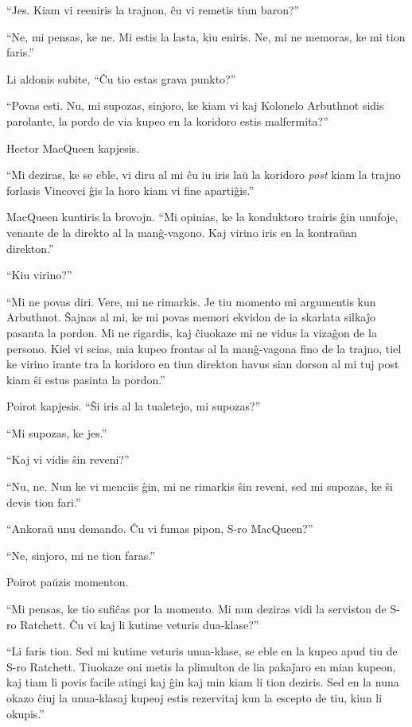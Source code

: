 ``Jes. Kiam vi reeniris la trajnon, ĉu vi remetis tiun baron?''

``Ne, mi pensas, ke ne. Mi estis la lasta, kiu eniris. Ne, mi ne memoras, ke mi tion faris.''

Li aldonis subite, ``Ĉu tio estas grava punkto?''

``Povas esti. Nu, mi supozas, sinjoro, ke kiam vi kaj Kolonelo Arbuthnot sidis parolante, la pordo de via kupeo en la koridoro estis malfermita?''

Hector MacQueen kapjesis.

``Mi deziras, ke se eble, vi diru al mi ĉu iu iris laŭ la koridoro \emph{post} kiam la trajno forlasis Vincovci ĝis la horo kiam vi fine apartiĝis.''

MacQueen kuntiris la brovojn. ``Mi opinias, ke la konduktoro trairis ĝin unufoje, venante de la direkto al la manĝ-vagono. Kaj virino iris en la kontraŭan direkton.''

``Kiu virino?''

``Mi ne povas diri. Vere, mi ne rimarkis. Je tiu momento mi argumentis kun Arbuthnot. Ŝajnas al mi, ke mi povas memori ekvidon de ia skarlata silkaĵo pasanta la pordon. Mi ne rigardis, kaj ĉiuokaze mi ne vidus la vizaĝon de la persono. Kiel vi scias, mia kupeo frontas al la manĝ-vagona fino de la trajno, tiel ke virino irante tra la koridoro en tiun direkton havus sian dorson al mi tuj post kiam ŝi estus pasinta la pordon.''

Poirot kapjesis. ``Ŝi iris al la tualetejo, mi supozas?''

``Mi supozas, ke jes.''

``Kaj vi vidis ŝin reveni?''

``Nu, ne. Nun ke vi menciis ĝin, mi ne rimarkis ŝin reveni, sed mi supozas, ke ŝi devis tion fari.''

``Ankoraŭ unu demando. Ĉu vi fumas pipon, S-ro MacQueen?''

``Ne, sinjoro, mi ne tion faras.''

Poirot paŭzis momenton.

``Mi pensas, ke tio sufiĉas por la momento. Mi nun deziras vidi la serviston de S-ro Ratchett. Ĉu vi kaj li kutime veturis dua-klase?''

``Li faris tion. Sed mi kutime veturis unua-klase, se eble en la kupeo apud tiu de S-ro Ratchett. Tiuokaze oni metis la plimulton de lia pakaĵaro en mian kupeon, kaj tiam li povis facile atingi kaj ĝin kaj min kiam li tion deziris. Sed en la nuna okazo ĉiuj la unua-klasaj kupeoj estis rezervitaj kun la escepto de tiu, kiun li okupis.''

